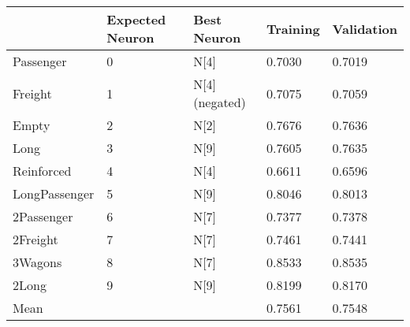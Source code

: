 \begin{tabular}{lllll}
\toprule
 & Expected Neuron & Best Neuron & Training & Validation \\
\midrule
Passenger & 0 & N[4] & 0.7030 & 0.7019 \\
Freight & 1 & N[4] (negated) & 0.7075 & 0.7059 \\
Empty & 2 & N[2] & 0.7676 & 0.7636 \\
Long & 3 & N[9] & 0.7605 & 0.7635 \\
Reinforced & 4 & N[4] & 0.6611 & 0.6596 \\
LongPassenger & 5 & N[9] & 0.8046 & 0.8013 \\
2Passenger & 6 & N[7] & 0.7377 & 0.7378 \\
2Freight & 7 & N[7] & 0.7461 & 0.7441 \\
3Wagons & 8 & N[7] & 0.8533 & 0.8535 \\
2Long & 9 & N[9] & 0.8199 & 0.8170 \\
Mean &  &  & 0.7561 & 0.7548 \\
\bottomrule
\end{tabular}

